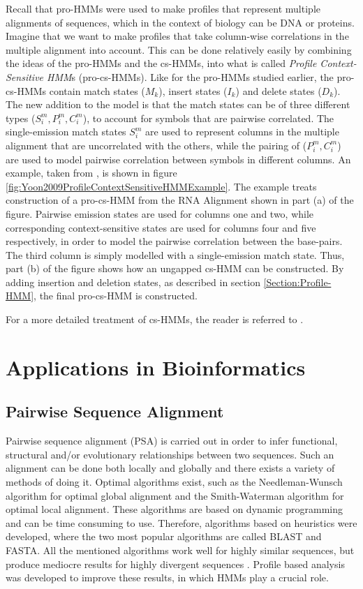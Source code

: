 \documentclass{article}\usepackage[]{graphicx}\usepackage[]{color}
\begin{document}
Recall that pro-HMMs were used to make profiles that represent multiple alignments of sequences, which in the context of biology can be DNA or proteins. Imagine that we want to make profiles that take column-wise correlations in the multiple alignment into account. This can be done relatively easily by combining the ideas of the pro-HMMs and the cs-HMMs, into what is called \textit{Profile Context-Sensitive HMM}s (pro-cs-HMMs). Like for the pro-HMMs studied earlier, the pro-cs-HMMs contain match states ($M_k$), insert states ($I_k$) and delete states ($D_k$). The new addition to the model is that the match states can be of three different types ($S_i^m, P_i^m, C_i^m$), to account for symbols that are pairwise correlated. The single-emission match states $S_i^m$ are used to represent columns in the multiple alignment that are uncorrelated with the others, while the pairing of ($P_i^m, C_i^m$) are used to model pairwise correlation between symbols in different columns. An example, taken from \cite{Yoon2009}, is shown in figure \ref{fig:Yoon2009ProfileContextSensitiveHMMExample}. The example treats construction of a pro-cs-HMM from the RNA Alignment shown in part (a) of the figure. Pairwise emission states are used for columns one and two, while corresponding context-sensitive states are used for columns four and five respectively, in order to model the pairwise correlation between the base-pairs. The third column is simply modelled with a single-emission match state. Thus, part (b) of the figure shows how an ungapped cs-HMM can be constructed. By adding insertion and deletion states, as described in section \ref{Section:Profile-HMM}, the final pro-cs-HMM is constructed. 

For a more detailed treatment of cs-HMMs, the reader is referred to \cite{Yoon2006}.

\section{Applications in Bioinformatics}

\subsection{Pairwise Sequence Alignment}\label{Section:PairwiseSequenceAlignment}
Pairwise sequence alignment (PSA) is carried out in order to infer functional, structural and/or evolutionary relationships between two sequences. Such an alignment can be done both locally and globally and there exists a variety of methods of doing it. Optimal algorithms exist, such as the Needleman-Wunsch algorithm for optimal global alignment and the Smith-Waterman algorithm for optimal local alignment. These algorithms are based on dynamic programming and can be time consuming to use. Therefore, algorithms based on heuristics were developed, where the two most popular algorithms are called BLAST and FASTA. All the mentioned algorithms work well for highly similar sequences, but produce mediocre results for highly divergent sequences \cite{Choo2004}. Profile based analysis was developed to improve these results, in which HMMs play a crucial role. 
\end{document}
